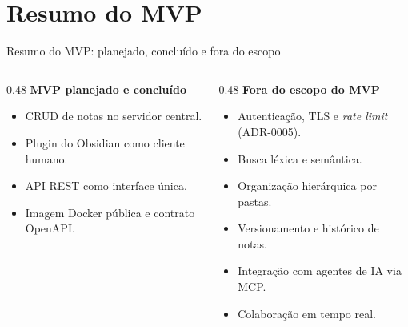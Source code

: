 \documentclass[aspectratio=169]{beamer}
\begin{document}
\section{Resumo do MVP}

\begin{frame}{Resumo do MVP: planejado, concluído e fora do escopo}
    \begin{columns}[T]
        \begin{column}{0.48\textwidth}
            \textbf{MVP planejado e concluído}
            \begin{itemize}\small
                \item CRUD de notas no servidor central.
                \item Plugin do Obsidian como cliente humano.
                \item API REST como interface única.
                \item Imagem Docker pública e contrato OpenAPI.
            \end{itemize}
        \end{column}
        \begin{column}{0.48\textwidth}
            \textbf{Fora do escopo do MVP}
            \begin{itemize}\small
                \item Autenticação, TLS e \textit{rate limit} (ADR-0005).
                \item Busca léxica e semântica.
                \item Organização hierárquica por pastas.
                \item Versionamento e histórico de notas.
                \item Integração com agentes de IA via MCP.
                \item Colaboração em tempo real.
            \end{itemize}
        \end{column}
    \end{columns}
\end{frame}
\end{document}

